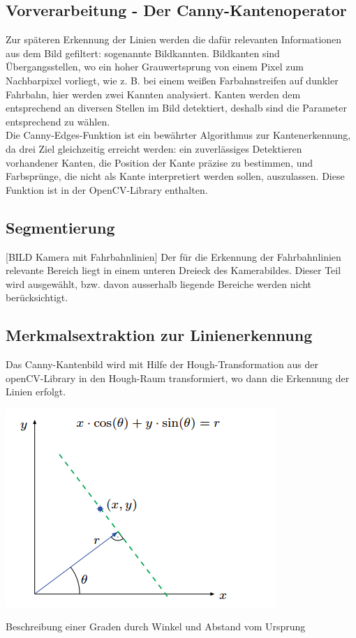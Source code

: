 \subsection{Vorverarbeitung - Der Canny-Kantenoperator}
Zur späteren Erkennung der Linien werden die dafür relevanten Informationen aus
dem Bild gefiltert: sogenannte Bildkannten. Bildkanten sind Übergangsstellen, wo
ein hoher Grauwertsprung von einem Pixel zum Nachbarpixel vorliegt, wie z. B. bei 
einem weißen Farbahnstreifen auf dunkler Fahrbahn, hier werden zwei Kannten
analysiert. Kanten werden dem entsprechend an diversen Stellen im Bild
detektiert, deshalb sind die Parameter entsprechend zu wählen.\\
Die Canny-Edges-Funktion ist ein bewährter Algorithmus zur Kantenerkennung, da drei Ziel
gleichzeitig erreicht werden: ein zuverlässiges Detektieren
vorhandener Kanten, die Position der Kante präzise zu bestimmen, und Farbsprünge, 
die nicht als Kante interpretiert werden sollen, auszulassen. Diese Funktion
ist in der OpenCV-Library enthalten. \\

\subsection{Segmentierung}
[BILD Kamera mit Fahrbahnlinien]
Der für die Erkennung der Fahrbahnlinien relevante Bereich liegt in einem
unteren Dreieck des Kamerabildes. Dieser Teil wird ausgewählt, bzw. davon ausserhalb
liegende Bereiche werden nicht berücksichtigt.\\

\subsection{Merkmalsextraktion zur Linienerkennung}
Das Canny-Kantenbild wird mit Hilfe der Hough-Transformation aus der
openCV-Library in den Hough-Raum transformiert, wo dann die Erkennung der Linien
erfolgt.

\begin{minipage}{\columnwidth}
  \makeatletter
  \def\@captype{figure}
  \makeatother
  \centering
  \includegraphics[width=0.8\linewidth]{images/gradeThetaR.png}
  \caption{Beschreibung einer Graden durch Winkel und Abstand vom Ursprung}
  \label{fig:gradeThetaR}
\end{minipage}

